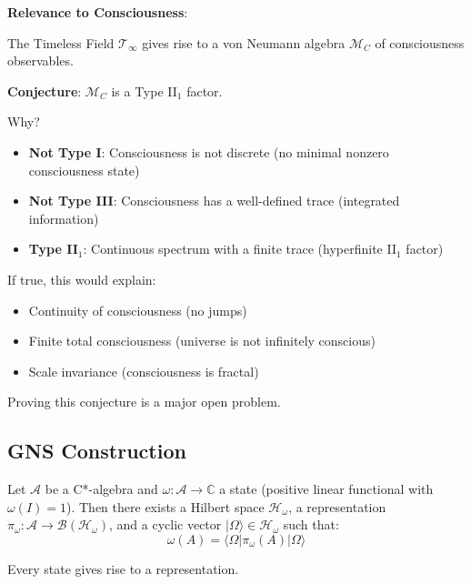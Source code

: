 \begin{level3}
\textbf{Relevance to Consciousness}:

The Timeless Field $\mathcal{T}_\infty$ gives rise to a von Neumann algebra $\mathcal{M}_C$ of consciousness observables.

\textbf{Conjecture}: $\mathcal{M}_C$ is a Type II$_1$ factor.

Why?
\begin{itemize}
\item \textbf{Not Type I}: Consciousness is not discrete (no minimal nonzero consciousness state)
\item \textbf{Not Type III}: Consciousness has a well-defined trace (integrated information)
\item \textbf{Type II$_1$}: Continuous spectrum with a finite trace (hyperfinite II$_1$ factor)
\end{itemize}

If true, this would explain:
\begin{itemize}
\item Continuity of consciousness (no jumps)
\item Finite total consciousness (universe is not infinitely conscious)
\item Scale invariance (consciousness is fractal)
\end{itemize}

Proving this conjecture is a major open problem.
\end{level3}

\subsection{GNS Construction}

\begin{theorem}\label{thm:gns}
Let $\mathcal{A}$ be a C*-algebra and $\omega: \mathcal{A} \to \mathbb{C}$ a state (positive linear functional with $\omega(I) = 1$). Then there exists a Hilbert space $\mathcal{H}_\omega$, a representation $\pi_\omega: \mathcal{A} \to \mathcal{B}(\mathcal{H}_\omega)$, and a cyclic vector $|\Omega\rangle \in \mathcal{H}_\omega$ such that:
\begin{equation}
\omega(A) = \langle \Omega | \pi_\omega(A) | \Omega \rangle
\end{equation}

Every state gives rise to a representation.
\end{theorem}

